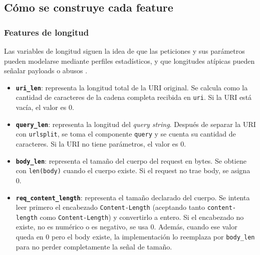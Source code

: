 \documentclass[12pt,oneside]{report}
\begin{document}
\subsection{Cómo se construye cada feature}

\subsubsection{Features de longitud}
Las variables de longitud siguen la idea de que las peticiones y sus parámetros pueden modelarse mediante perfiles estadísticos, y que longitudes atípicas pueden señalar payloads o abusos \cite{kruegel_vigna_2003,ingham_inoue_2007}.
\begin{itemize}[leftmargin=*]
  \item \textbf{\texttt{uri\_len}}: representa la longitud total de la URI original. Se calcula como la cantidad de caracteres de la cadena completa recibida en \texttt{uri}. Si la URI está vacía, el valor es 0.

  \item \textbf{\texttt{query\_len}}: representa la longitud del \textit{query string}. Después de separar la URI con \texttt{urlsplit}, se toma el componente \texttt{query} y se cuenta su cantidad de caracteres. Si la URI no tiene parámetros, el valor es 0.

  \item \textbf{\texttt{body\_len}}: representa el tamaño del cuerpo del request en bytes. Se obtiene con \texttt{len(body)} cuando el cuerpo existe. Si el request no trae body, se asigna 0.

  \item \textbf{\texttt{req\_content\_length}}: representa el tamaño declarado del cuerpo. Se intenta leer primero el encabezado \texttt{Content-Length} (aceptando tanto \texttt{content-length} como \texttt{Content-Length}) y convertirlo a entero. Si el encabezado no existe, no es numérico o es negativo, se usa 0. Además, cuando ese valor queda en 0 pero el body existe, la implementación lo reemplaza por \texttt{body\_len} para no perder completamente la señal de tamaño.
\end{itemize}
\end{document}
